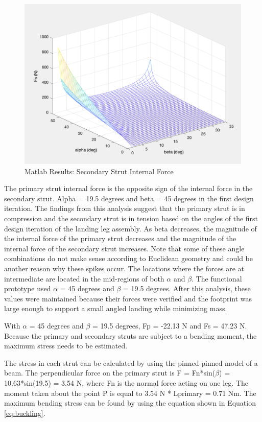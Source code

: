 \begin{figure}[H]
\centering
\includegraphics[scale=0.6]{src/figs/fsml.png}
\caption{Matlab Results: Secondary Strut Internal Force}
\label{figs:fsml}
\end{figure}

The primary strut internal force is the opposite sign of the internal force in the secondary strut. Alpha = 19.5 degrees and beta = 45 degrees in the first design iteration. The findings from this analysis suggest that the primary strut is in compression and the secondary strut is in tension based on the angles of the first design iteration of the landing leg assembly. As beta decreases, the magnitude of the internal force of the primary strut decreases and the magnitude of the internal force of the secondary strut increases.  Note that some of these angle combinations do not make sense according to Euclidean geometry and could be another reason why these spikes occur. The locations where the forces are at intermediate are located in the mid-regions of both $\alpha$ and $\beta$. The functional prototype used $\alpha$ = 45 degrees and $\beta$ = 19.5 degrees. After this analysis, these values were maintained because their forces were verified and the footprint was large enough to support a small angled landing while minimizing mass. 

With $\alpha$ = 45 degrees and $\beta$ = 19.5 degrees, Fp = -22.13 N and Fs = 47.23 N. Because the primary and secondary struts are subject to a bending moment, the maximum stress needs to be estimated. 

The stress in each strut can be calculated by using the pinned-pinned model of a beam. The perpendicular force on the primary strut is F = Fn*sin($\beta$) = 10.63*sin(19.5) = 3.54 N, where Fn is the normal force acting on one leg. The moment taken about the point P is equal to 3.54 N * Lprimary = 0.71 Nm. 
The maximum bending stress can be found by using the equation shown in Equation \ref{eq:buckling}.

